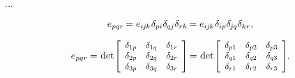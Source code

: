 ...



\nopagebreak\vspace{-0.2em}\begin{equation*}
e_{pqr} \hspace{-0.2ex}
= e_{i\hspace{-0.1ex}j\hspace{-0.1ex}k} \hspace{.1ex} \delta_{pi} \delta_{\hspace{-0.1ex}qj} \delta_{rk} \hspace{-0.2ex}
= e_{i\hspace{-0.1ex}j\hspace{-0.1ex}k} \hspace{.1ex} \delta_{ip} \delta_{\hspace{-0.15ex}j\hspace{-0.1ex}q} \delta_{kr}
\hspace{.1ex} ,
\end{equation*}

\nopagebreak\vspace{-0.1em}
\begin{equation}\label{permutationsymbolasdeterminant}
e_{pqr} \hspace{-0.1ex}
= \hspace{.1ex}
\operatorname{det}\hspace{-0.25ex} \scalebox{.92}{$\left[ \begin{array}{ccc}
\delta_{1p} & \delta_{1q} & \delta_{1r} \\
\delta_{2p} & \delta_{2q} & \delta_{2r} \\
\delta_{3p} & \delta_{3q} & \delta_{3r}
\end{array} \hspace{-0.1ex} \right]$} \hspace{-0.2ex}
= \hspace{.1ex}
\operatorname{det}\hspace{-0.25ex} \scalebox{.92}{$\left[ \begin{array}{ccc}
\delta_{p1} & \delta_{p2} & \delta_{p3} \\
\delta_{q1} & \delta_{q2} & \delta_{q3} \\
\delta_{r1} & \delta_{r2} & \delta_{r3}
\end{array} \hspace{-0.1ex} \right]$}
\hspace{-0.2ex} .
\end{equation}

